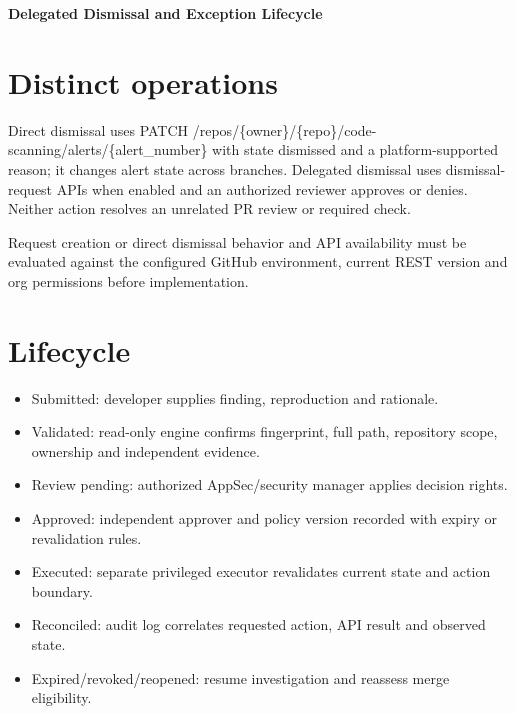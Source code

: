 \documentclass[11pt,letterpaper]{article}
\begin{document}
\begin{center}
{\LARGE\bfseries Delegated Dismissal and Exception Lifecycle}\par
\vspace{5pt}{\large Keep review authority separate from direct state mutation}\par
\vspace{9pt}{\small Engineering reference | Proposed design | Not a deployment or approval record}\par
\end{center}
\tableofcontents
\clearpage
\section{Distinct operations}
Direct dismissal uses PATCH /repos/\{owner\}/\{repo\}/code-scanning/alerts/\{alert\_number\} with state dismissed and a platform-supported reason; it changes alert state across branches. Delegated dismissal uses dismissal-request APIs when enabled and an authorized reviewer approves or denies. Neither action resolves an unrelated PR review or required check.

Request creation or direct dismissal behavior and API availability must be evaluated against the configured GitHub environment, current REST version and org permissions before implementation.


\section{Lifecycle}
\begin{itemize}
\item Submitted: developer supplies finding, reproduction and rationale.
\item Validated: read-only engine confirms fingerprint, full path, repository scope, ownership and independent evidence.
\item Review pending: authorized AppSec/security manager applies decision rights.
\item Approved: independent approver and policy version recorded with expiry or revalidation rules.
\item Executed: separate privileged executor revalidates current state and action boundary.
\item Reconciled: audit log correlates requested action, API result and observed state.
\item Expired/revoked/reopened: resume investigation and reassess merge eligibility.
\end{itemize}
\end{document}
